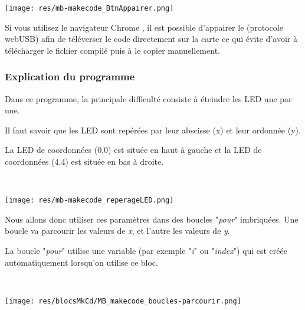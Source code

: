 \begin{remarque}

\texttt{[image: res/mb-makecode\_BtnAppairer.png]}

Si vous utilisez le navigateur Chrome \textregistered, il est possible d'appairer le \mb (protocole webUSB) afin de téléverser le code directement sur la carte ce qui évite d'avoir à télécharger le fichier compilé puis à le copier manuellement.
\end{remarque}


\subsubsection{Explication du programme}

\begin{minipage}[t]{0.75\linewidth}

Dans ce programme, la principale difficulté consiste à éteindre les LED une par une.

Il faut savoir que les LED sont repérées par leur abscisse (x) et leur ordonnée (y).

La LED de coordonnées (0,0) est située en haut à gauche et la LED de coordonnées (4,4) est située en bas à droite.
\end{minipage}
\hfill
\begin{minipage}[t]{0.25\linewidth}~\\
  \vspace{-2mm}
  \begin{center}
    \texttt{[image: res/mb-makecode\_reperageLED.png]}
  \end{center}
\end{minipage}


Nous allons donc utiliser ces paramètres dans des boucles "\emph{pour}" imbriquées. Une boucle va parcourir les valeurs de \textit{x}, et l'autre les valeurs de \textit{y}.


\begin{minipage}[t]{0.75\linewidth}

La boucle "\emph{pour}" utilise une variable (par exemple "\emph{i}" ou "\emph{index}") qui est créée automatiquement lorsqu'on utilise ce bloc.
\end{minipage}
\hfill
\begin{minipage}[t]{0.25\linewidth}~\\
  \vspace{-2mm}
  \begin{center}
    \texttt{[image: res/blocsMkCd/MB\_makecode\_boucles-parcourir.png]}
  \end{center}
\end{minipage}



